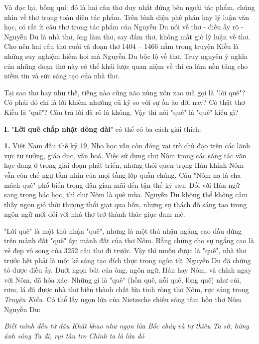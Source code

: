 \documentclass[../main.tex]{subfiles}
\begin{document}
\begin{multicols}{2}
Và đọc lại, bỗng quí: đó là hai câu thơ duy nhất đứng bên ngoài tác phẩm, chúng nhìn về thơ trong toàn diện tác phẩm. Trên bình diện phê phán hay lý luận văn học, có rất ít câu thơ trong tác phẩm của Nguyễn Du nói về thơ - điều ấy rõ - Nguyễn Du là nhà thơ, ông làm thơ, say đắm thơ, không mất giờ lý luận về thơ. Cho nên hai câu thơ cuối và đoạn thơ 1404 – 1466 nằm trong truyện Kiều là những suy nghiệm hiếm hoi mà Nguyễn Du bộc lộ về thơ. Truy nguyên ý nghĩa của những đoạn thơ này có thể khái lược quan niệm về thi ca làm nền tảng cho niềm tin và sức sáng tạo của nhà thơ.  
 
Tại sao thơ hay như thế, tiếng nào cũng não nùng xôn xao mà gọi là "lời quê"? Có phải đó chỉ là lời khiêm nhường cũ kỹ so với sự ồn ào đời nay? Có thật thơ Kiều là "quê"? Câu trả lời đã rõ là không. Vậy thì nói "quê" là "quê" kiểu gì? 
 
 
\textbf{I.} "\textbf{Lời quê chắp nhặt dông dài}" có thể có ba cách giải thích: 
 
\textbf{1.} Việt Nam đầu thế kỷ 19, Nho học vẫn còn đóng vai trò chủ đạo trên các lãnh vực tư tưởng, giáo dục, văn hoá. Việc sử dụng chữ Nôm trong các sáng tác văn học đang ở trong giai đoạn phát triển, nhưng thói quen trọng Hán khinh Nôm vẫn còn chế ngự tầm nhìn của mọi tầng lớp quần chúng. Câu "Nôm na là cha mách qué" phổ biến trong dân gian mãi đến tận thế kỷ sau. Đối với Hán ngữ sang trọng bác học, thì chữ Nôm là quê mùa. Nguyễn Du không thể không cảm thấy ngọn gió thời thượng thổi giạt qua hồn, nhưng sự thách đố sáng tạo trong ngôn ngữ mới đối với nhà thơ trở thành thúc giục đam mê. 
 
"Lời quê" là một thú nhận "quê", nhưng là một thú nhận ngẩng cao đầu đứng trên mảnh đất "quê" ấy: mảnh đất của thơ Nôm. Bằng chứng cho sự ngẩng cao là vẻ đẹp vô song của 3252 câu thơ đi trước. Vậy thì muốn được là "quê", nhà thơ trước hết phải là một kẻ sáng tạo đích thực trong ngôn từ. Nguyễn Du đã chứng tỏ được điều ấy. Dưới ngọn bút của ông, ngôn ngữ, Hán hay Nôm, và chính ngay với Nôm, đã hóa xác. Những gì là "quê" (hồn quê, nỗi quê, lòng quê) như củi, rơm, lá đã được nhà thơ biến thành chất lửa tinh ròng thơ Nôm, rực sáng trong \textit{Truyện Kiều}. Có thể lấy ngọn lửa của Nietzsche chiếu sáng tâm hồn thơ Nôm Nguyễn Du: 
\begin{blockquote}
        
\textit{Biết mình đến từ đâu}        
\textit{Khát khao như ngọn lửa}        
\textit{Bốc cháy và tự thiêu}        
\textit{Ta sờ, hừng ánh sáng}        
\textit{Ta đi, rụi tàn tro} 
\textit{Chính ta là lửa đỏ} 
         

\end{blockquote}
\end{multicols}
\end{document}
